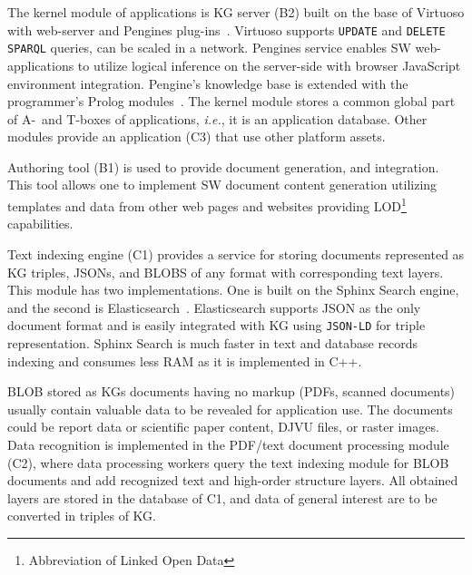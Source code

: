 \documentclass[
]{aiitart}
\begin{document}
The kernel module of applications is KG server (B2) built on the base of Virtuoso with web-server and Pengines plug-ins~\cite{pengines}.  %
Virtuoso supports \verb|UPDATE| and \verb|DELETE| \verb|SPARQL| queries, can be scaled in a network.  Pengines service enables SW web-applications to utilize logical inference on the server-side with browser JavaScript environment integration.  Pengine's knowledge base is extended with the programmer's Prolog modules~\cite{b10,swi}.  The kernel module stores a common global part of A-~and T-boxes of applications, \emph{i.e.}, it is an application database.  Other modules provide an application (C3) that use other platform assets.

Authoring tool (B1) \cite{authoring,zont19} is used to provide document generation, and integration.  This tool allows one to implement SW document content generation utilizing templates and data from other web pages and websites providing LOD\footnote{Abbreviation of Linked Open Data} \cite{b1,c6} capabilities. %

Text indexing engine (C1) provides a service for storing documents represented as KG triples, JSONs, and BLOBS of any format with corresponding text layers.  This module has two implementations.  One is built on the Sphinx Search engine, and the second is Elasticsearch~\cite{b13}.  Elasticsearch supports JSON as the only document format and is easily integrated with KG using \verb|JSON-LD| for triple representation.  Sphinx Search is much faster in text and database records indexing and consumes less RAM as it is implemented in C++. %

BLOB stored as KGs documents having no markup (PDFs, scanned documents) usually contain valuable data to be revealed for application use.  The documents could be report data or scientific paper content, DJVU files, or raster images.  Data recognition is implemented in the PDF/text document processing module (C2), where data processing workers query the text indexing module for BLOB documents and add recognized text and high-order structure layers.  All obtained layers are stored in the database of C1, and data of general interest are to be converted in triples of KG.
\end{document}
